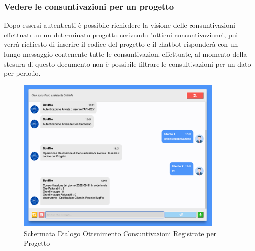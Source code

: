 \subsubsection{Vedere le consuntivazioni per un progetto}
Dopo essersi autenticati è possibile richiedere la visione delle consuntivazioni effettuate su un determinato progetto scrivendo "ottieni consuntivazione", poi verrà richiesto di inserire il codice del progetto e il chatbot risponderà con un lungo messaggio contenente tutte le consuntivazioni effettuate, al momento della stesura di questo documento non è possibile filtrare le consultivazioni per un dato per periodo. 
\begin{figure}[H]
    \centering\includegraphics[width=0.9\textwidth, height=0.7\textheight, keepaspectratio]{images/schermata_ottieni_consultivazione.png}
    \caption{Schermata Dialogo Ottenimento Consuntivazioni Registrate per Progetto}
\end{figure}